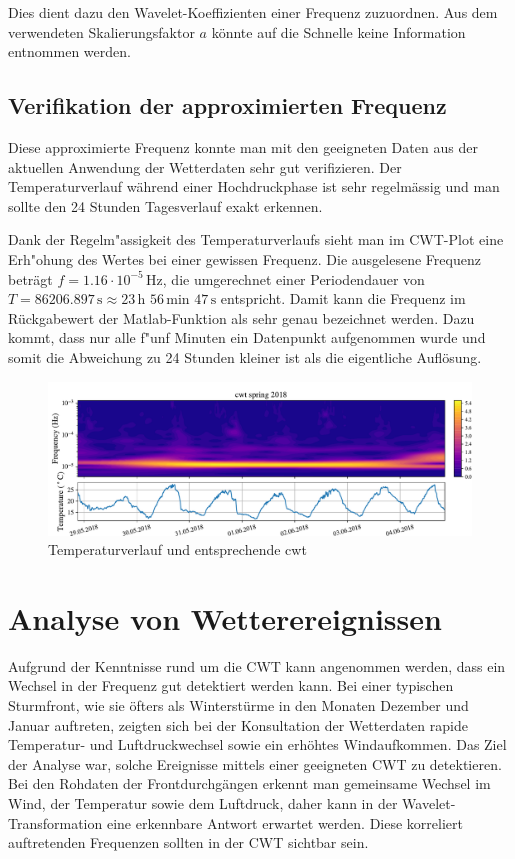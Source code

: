 \begin{refsection}
Dies dient dazu den Wavelet-Koeffizienten einer Frequenz zuzuordnen. 
Aus dem verwendeten Skalierungsfaktor $a$ könnte auf die Schnelle keine Information entnommen werden.


\subsection{Verifikation der approximierten Frequenz}
\label{Freq}
Diese approximierte Frequenz konnte man mit den geeigneten Daten aus der aktuellen Anwendung der Wetterdaten sehr gut verifizieren.
Der Temperaturverlauf während einer Hochdruckphase ist sehr regelmässig und man sollte den 24 Stunden Tagesverlauf exakt erkennen.

Dank der Regelm"assigkeit des Temperaturverlaufs sieht man im CWT-Plot eine Erh"ohung des Wertes bei einer gewissen Frequenz.
Die ausgelesene Frequenz beträgt $f = 1.16\cdot10^{-5} \,\text{Hz}$, die umgerechnet einer Periodendauer von $T = 86206.897\,\text{s}\approx 23\,\text{h }56\,\text{min } 47\,\text{s}$ entspricht.
Damit kann die Frequenz im Rückgabewert der Matlab-Funktion als sehr genau bezeichnet werden.
Dazu kommt, dass nur alle f"unf Minuten ein Datenpunkt aufgenommen wurde und somit die Abweichung zu 24 Stunden kleiner ist als die eigentliche Auflösung.

\begin{figure}
	\centering
	\includegraphics[width=1\textwidth]{papers/wwt/images/data_spring.pdf}
	\caption{Temperaturverlauf und entsprechende cwt}
	\label{fig:cwt_zoom}
\end{figure}



\section{Analyse von Wetterereignissen}
%
Aufgrund der Kenntnisse rund um die CWT kann angenommen werden, dass ein Wechsel in der Frequenz gut detektiert werden kann.
%
Bei einer typischen Sturmfront, wie sie öfters als Winterstürme in den Monaten Dezember und Januar auftreten, zeigten sich bei der Konsultation der Wetterdaten rapide Temperatur- und Luftdruckwechsel sowie ein erhöhtes Windaufkommen.
%
Das Ziel der Analyse war, solche Ereignisse mittels einer geeigneten CWT zu detektieren.
Bei den Rohdaten der Frontdurchgängen erkennt man gemeinsame Wechsel im Wind, der Temperatur sowie dem Luftdruck, daher kann in der Wavelet-Transformation eine erkennbare Antwort erwartet werden. 
Diese korreliert auftretenden Frequenzen sollten in der CWT sichtbar sein.


\end{refsection}
